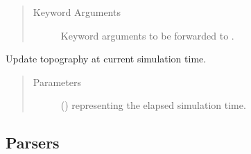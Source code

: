 \documentclass[letterpaper,10pt,english]{sphinxmanual}
\begin{document}
\begin{fulllineitems}
\begin{fulllineitems}
\begin{quote}
\begin{description}
\item[{Keyword Arguments}] \leavevmode
{} \textendash{} Keyword arguments to be forwarded to .

\end{description}\end{quote}

\end{fulllineitems}


\begin{fulllineitems}
\label{\detokenize{api:grids.topography.Topography2d.update}}
Update topography at current simulation time.
\begin{quote}\begin{description}
\item[{Parameters}] \leavevmode
{} () \textendash{}  representing the elapsed simulation time.

\end{description}\end{quote}

\end{fulllineitems}


\end{fulllineitems}



\subsection{Parsers}
\label{\detokenize{api:parsers}}
\end{document}
